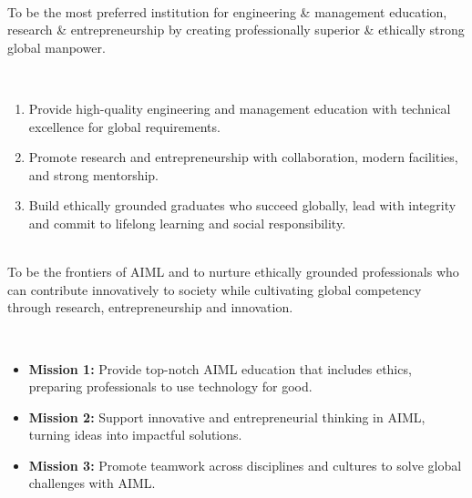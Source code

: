 \newpage
\thispagestyle{frontmatterstyle}

\\
To be the most preferred institution for engineering \& management education, research \& entrepreneurship by creating professionally superior \& ethically strong global manpower.

\vspace{0.3cm}
\\
\begin{enumerate}
    \item Provide high-quality engineering and management education with technical excellence for global requirements.
    \item Promote research and entrepreneurship with collaboration, modern facilities, and strong mentorship.
    \item Build ethically grounded graduates who succeed globally, lead with integrity and commit to lifelong learning and social responsibility.
\end{enumerate}

\vspace{0.3cm}
\\
To be the frontiers of AIML and to nurture ethically grounded professionals who can contribute innovatively to society while cultivating global competency through research, entrepreneurship and innovation.

\vspace{0.3cm}
\\
\begin{itemize}
    \item \textbf{Mission 1:} Provide top-notch AIML education that includes ethics, preparing professionals to use technology for good.
    \item \textbf{Mission 2:} Support innovative and entrepreneurial thinking in AIML, turning ideas into impactful solutions.
    \item \textbf{Mission 3:} Promote teamwork across disciplines and cultures to solve global challenges with AIML.
\end{itemize}

